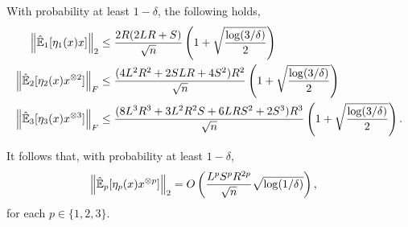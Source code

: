\documentclass[tablecaption=bottom]{jmlr}
\begin{document}
\begin{lemma}
\label{lem:lowRankUpper}
With probability at least $1-\delta$, the following holds,
\begin{align*}
    \left\|\hat{\operatorname{\mathbb{E}}}_1[\eta_1(x) x] \right\|_2
      &\le \frac{2R (2LR + S)}{\sqrt{n}} \left( 1 + \sqrt{\frac{\log(3/\delta)}{2}} \right) \\
  \left\|\hat{\operatorname{\mathbb{E}}}_2[\eta_2(x) x^{\otimes 2}] \right\|_F
      &\le \frac{(4L^2 R^2 + 2 S L R + 4S^2)R^2}{\sqrt{n}} \left( 1 + \sqrt{\frac{\log(3/\delta)}{2}} \right) \\
  \left\|\hat{\operatorname{\mathbb{E}}}_3[\eta_3(x) x^{\otimes 3}] \right\|_F
      &\le \frac{(8L^3 R^3 + 3 L^2 R^2 S + 6 L R S^2 + 2S^3) R^3}{\sqrt{n}} \left( 1 + \sqrt{\frac{\log(3/\delta)}{2}} \right).
\end{align*}
\end{lemma}

It follows that, with probability at least $1-\delta$,
\begin{align*}
  \left\|\hat{\operatorname{\mathbb{E}}}_p[\eta_p(x) x^{\otimes p}] \right\|_2
  &= O\left( \frac{L^p S^p R^{2p}}{\sqrt{n}} \sqrt{\log(1/\delta)} \right),
\end{align*}
for each $p \in \{1,2,3\}$.
\end{document}
